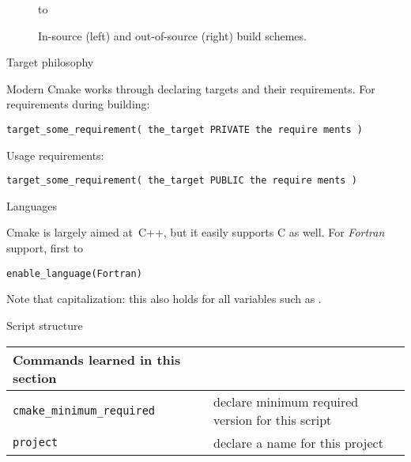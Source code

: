 \makeatother

\begin{figure}[ht]
  \hbox to \textwidth\bgroup
  \begin{minipage}{.45\textwidth}
  \end{minipage}
  \hss
  \begin{minipage}{.45\textwidth}
  \end{minipage}
  \egroup
  \caption{In-source (left) and out-of-source (right) build schemes.}
  \label{fig:cmake-buildinstall}
\end{figure}

 {Target philosophy}

Modern Cmake works through declaring targets and their requirements.
For requirements during building:
\begin{lstlisting}
target_some_requirement( the_target PRIVATE the require ments )
\end{lstlisting}
Usage requirements:
\begin{lstlisting}
target_some_requirement( the_target PUBLIC the require ments )
\end{lstlisting}

 {Languages}

Cmake is largely aimed at~C++, but it easily supports C as well.
For \emph{Fortran} support,
first to 
\begin{lstlisting}
enable_language(Fortran)
\end{lstlisting}
Note that capitalization: this also holds for all variables
such as .

 {Script structure}

\begin{tabular}{lp{3in}}
  \toprule
  Commands learned in this section\\
  \midrule
  \lstinline+cmake_minimum_required+&declare minimum required version for this script\\
  \lstinline+project+&declare a name for this project\\
  \bottomrule
\end{tabular}


